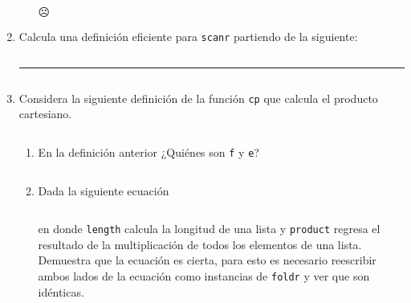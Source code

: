 \documentclass[11pt,letterpaper]{article}
\newcommand{\code}[1]{\textcolor{WildStrawberry}{\texttt{#1}}}
\begin{document}
\begin{enumerate}
\begin{enumerate}[label=\alph*)]
    $\frownie$
\end{enumerate}

\item Calcula una definición eficiente para \code{scanr} partiendo de la siguiente:

\inputminted{haskell}{assets/3.hs}

\noindent
{\color{Turquoise} \rule{\linewidth}{0.4mm} }

\inputminted{haskell}{assets/3-answer.hs}

\item Considera la siguiente definición de la función \code{cp} que calcula el producto cartesiano.

\inputminted{haskell}{assets/4-1.hs}

\begin{enumerate}[label=\alph*)]
    
    \item En la definición anterior ¿Quiénes son \code{f} y \code{e}?
    
    \inputminted{haskell}{assets/4-a-answer.hs}
    
    \item Dada la siguiente ecuación
    \inputminted{haskell}{assets/4-b.hs}

    en donde \code{length} calcula la longitud de una lista y \code{product} regresa el resultado de la
    multiplicación de todos los elementos de una lista. Demuestra que la ecuación es cierta, para esto
    es necesario reescribir ambos lados de la ecuación como instancias de \code{foldr} y ver que son idénticas.

    \inputminted{haskell}{assets/4-b-answer.hs}

\end{enumerate}


\end{enumerate}



\end{document}
